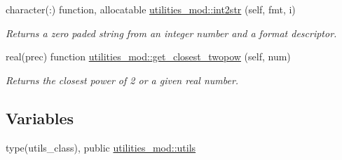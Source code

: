 \begin{DoxyCompactItemize}
character(\+:) function, allocatable \mbox{\hyperlink{namespaceutilities__mod_a6ba00b0a503f26c7e755d1efbbe83c5b}{utilities\+\_\+mod\+::int2str}} (self, fmt, i)
\begin{DoxyCompactList}\small\item\em Returns a zero paded string from an integer number and a format descriptor. \end{DoxyCompactList}\item 
real(prec) function \mbox{\hyperlink{namespaceutilities__mod_a164054d89c012d95f63c12a6cc0ac8d7}{utilities\+\_\+mod\+::get\+\_\+closest\+\_\+twopow}} (self, num)
\begin{DoxyCompactList}\small\item\em Returns the closest power of 2 or a given real number. \end{DoxyCompactList}\end{DoxyCompactItemize}
\subsection*{Variables}
\begin{DoxyCompactItemize}
\item 
type(utils\+\_\+class), public \mbox{\hyperlink{namespaceutilities__mod_aa12c2506b3107528a2511d059186f12d}{utilities\+\_\+mod\+::utils}}
\end{DoxyCompactItemize}
